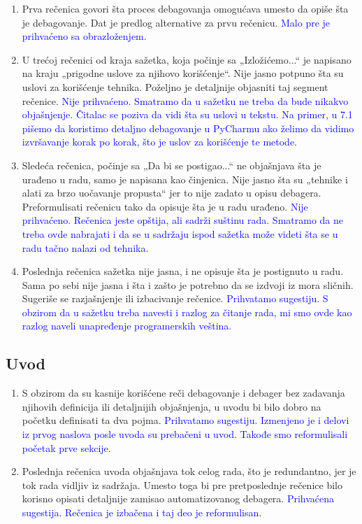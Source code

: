 \documentclass[a4paper]{report}
\newcommand{\odgovor}[1]{\textcolor{blue}{#1}}
\begin{document}
\begin{enumerate}
    \item Prva rečenica govori šta proces debagovanja omogućava umesto da opiše šta je debagovanje. Dat je predlog alternative za prvu rečenicu.
    \odgovor{Malo pre je prihvaćeno sa obrazloženjem.}
    \item U trećoj rečenici od kraja sažetka, koja počinje sa „Izložićemo...“ je napisano na kraju „prigodne uslove za njihovo korišćenje“. Nije jasno potpuno šta su uslovi za korišćenje tehnika. Poželjno je detaljnije objasniti taj segment rečenice.
    \odgovor{Nije prihvaćeno. Smatramo da u sažetku ne treba da bude nikakvo objašnjenje. Čitalac se poziva da vidi šta su uslovi u tekstu. Na primer, u 7.1 pišemo da koristimo detaljno debagovanje u PyCharmu ako želimo da vidimo izvršavanje korak po korak, što je uslov za korišćenje te metode.}
    \item Sledeća rečenica, počinje sa „Da bi se postigao...“ ne objašnjava šta je urađeno u radu, samo je napisana kao činjenica. Nije jasno šta su „tehnike i alati za brzo uočavanje propusta“ jer to nije zadato u opisu debagera. Preformulisati rečenicu tako da opisuje šta je u radu urađeno.
    \odgovor{Nije prihvaćeno. Rečenica jeste opštija, ali sadrži suštinu rada. Smatramo da ne treba ovde nabrajati i da se u sadržaju ispod sažetka može videti šta se u radu tačno nalazi od tehnika.}
    \item Poslednja rečenica sažetka nije jasna, i ne opisuje šta je postignuto u radu. Sama po sebi nije jasna i šta i zašto je potrebno da se izdvoji iz mora sličnih. Sugeriše se razjašnjenje ili izbacivanje rečenice.
    \odgovor{Prihvatamo sugestiju. S obzirom da u sažetku treba navesti i razlog za čitanje rada, mi smo ovde kao razlog naveli unapređenje programerskih veština.}
\end{enumerate}

\subsection{Uvod}
\begin{enumerate}
    \item S obzirom da su kasnije korišćene reči debagovanje i debager bez zadavanja njihovih definicija ili detaljnijih objašnjenja, u uvodu bi bilo dobro na početku definisati ta dva pojma.
    \odgovor{Prihvatamo sugestiju. Izmenjeno je i delovi iz prvog naslova posle uvoda su prebačeni u uvod. Takođe smo reformulisali početak prve sekcije.}
    \item Poslednja rečenica uvoda objašnjava tok celog rada, što je redundantno, jer je tok rada vidljiv iz sadržaja. Umesto toga bi pre pretposlednje rečenice bilo korisno opisati detaljnije zamisao automatizovanog debagera.
    \odgovor{Prihvaćena sugestija. Rečenica je izbačena i taj deo je reformulisan.}
\end{enumerate}
\end{document}
